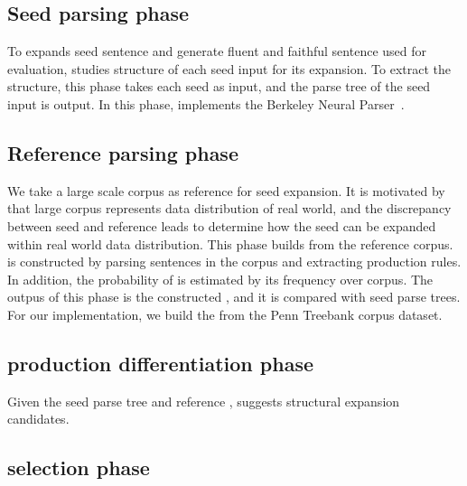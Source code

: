 \subsection{Seed parsing phase}
To expands seed sentence and generate fluent and faithful sentence
used for evaluation, \Model studies structure of each seed input for
its expansion. To extract the structure, this phase takes each seed as
input, and the parse tree of the seed input is output.  In this phase,
\Model implements the Berkeley Neural
Parser~\cite{kitaev2018seedparser,kitaev2019seedparser}.

\subsection{Reference parsing phase}
We take a large scale corpus as reference for seed expansion. It is
motivated by that large corpus represents data distribution of real
world, and the discrepancy between seed and reference leads to
determine how the seed can be expanded within real world data
distribution. This phase builds \pcfg from the reference corpus. \cfg
is constructed by parsing sentences in the corpus and extracting
production rules. In addition, the probability of \cfg is estimated by
its frequency over corpus. The outpus of this phase is the constructed
\pcfg, and it is compared with seed parse trees. For our
implementation, we build the \pcfg from the Penn Treebank corpus dataset.

\subsection{production differentiation phase}
Given the seed parse tree and reference \pcfg, \Model suggests
structural expansion candidates.


\subsection{\Sent selection phase}
